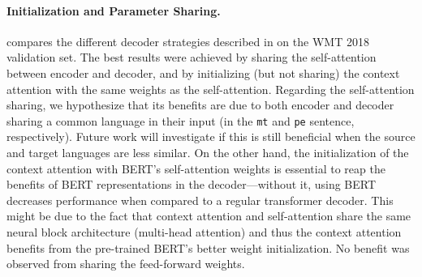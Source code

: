 \paragraph*{Initialization and Parameter Sharing.}
 compares the different decoder
strategies described in  on the WMT 2018
validation set. The best results were achieved by sharing the
self-attention between encoder and decoder, and by initializing (but
not sharing) the context attention with the same weights as the
self-attention. Regarding the self-attention sharing, we hypothesize
that its benefits are due to both encoder and decoder sharing a
common language in their input (in the {\tt mt} and {\tt pe}
sentence, respectively). Future work will investigate if this is
still beneficial when the source and target languages are less
similar. On the other hand, the initialization of the context
attention with BERT's self-attention weights is essential to reap the
benefits of BERT representations in the decoder---without it, using
BERT decreases performance when compared to a regular transformer
decoder. This might be due to the fact that context attention and
self-attention share the same neural block architecture (multi-head
attention) and thus the context attention benefits from the
pre-trained BERT's better weight initialization. No benefit was
observed from sharing the feed-forward weights.

